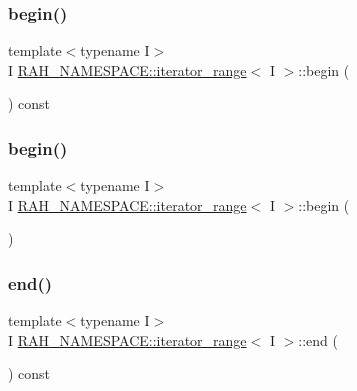 \subsubsection{\texorpdfstring{begin()}{begin()}\hspace{0.1cm}{\footnotesize\ttfamily [1/2]}}
{\footnotesize\ttfamily template$<$typename I$>$ \\
I \mbox{\hyperlink{struct_r_a_h___n_a_m_e_s_p_a_c_e_1_1iterator__range}{R\+A\+H\+\_\+\+N\+A\+M\+E\+S\+P\+A\+C\+E\+::iterator\+\_\+range}}$<$ I $>$\+::begin (\begin{DoxyParamCaption}{ }\end{DoxyParamCaption}) const\hspace{0.3cm}{\ttfamily [inline]}}

\mbox{\label{struct_r_a_h___n_a_m_e_s_p_a_c_e_1_1iterator__range_aa34dfea09501b4d1c85c8189b10d4234}} 
\subsubsection{\texorpdfstring{begin()}{begin()}\hspace{0.1cm}{\footnotesize\ttfamily [2/2]}}
{\footnotesize\ttfamily template$<$typename I$>$ \\
I \mbox{\hyperlink{struct_r_a_h___n_a_m_e_s_p_a_c_e_1_1iterator__range}{R\+A\+H\+\_\+\+N\+A\+M\+E\+S\+P\+A\+C\+E\+::iterator\+\_\+range}}$<$ I $>$\+::begin (\begin{DoxyParamCaption}{ }\end{DoxyParamCaption})\hspace{0.3cm}{\ttfamily [inline]}}

\mbox{\label{struct_r_a_h___n_a_m_e_s_p_a_c_e_1_1iterator__range_a05e81ee6fc6378ea932c9b39b3fb5314}} 
\subsubsection{\texorpdfstring{end()}{end()}\hspace{0.1cm}{\footnotesize\ttfamily [1/2]}}
{\footnotesize\ttfamily template$<$typename I$>$ \\
I \mbox{\hyperlink{struct_r_a_h___n_a_m_e_s_p_a_c_e_1_1iterator__range}{R\+A\+H\+\_\+\+N\+A\+M\+E\+S\+P\+A\+C\+E\+::iterator\+\_\+range}}$<$ I $>$\+::end (\begin{DoxyParamCaption}{ }\end{DoxyParamCaption}) const\hspace{0.3cm}{\ttfamily [inline]}}

